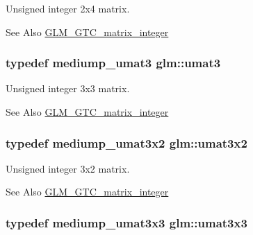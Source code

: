 Unsigned integer 2x4 matrix. 

\begin{DoxySeeAlso}{See Also}
\hyperlink{group__gtc__matrix__integer}{G\-L\-M\-\_\-\-G\-T\-C\-\_\-matrix\-\_\-integer} 
\end{DoxySeeAlso}
\hypertarget{group__gtc__matrix__integer_ga8b8fbc858e28abf8fc344744f8d6d368}{
\subsubsection[{umat3}]{\setlength{\rightskip}{0pt plus 5cm}typedef mediump\-\_\-umat3 {\bf glm\-::umat3}}}\label{group__gtc__matrix__integer_ga8b8fbc858e28abf8fc344744f8d6d368}


Unsigned integer 3x3 matrix. 

\begin{DoxySeeAlso}{See Also}
\hyperlink{group__gtc__matrix__integer}{G\-L\-M\-\_\-\-G\-T\-C\-\_\-matrix\-\_\-integer} 
\end{DoxySeeAlso}
\hypertarget{group__gtc__matrix__integer_ga257300f2710612877ef45438a366e308}{
\subsubsection[{umat3x2}]{\setlength{\rightskip}{0pt plus 5cm}typedef mediump\-\_\-umat3x2 {\bf glm\-::umat3x2}}}\label{group__gtc__matrix__integer_ga257300f2710612877ef45438a366e308}


Unsigned integer 3x2 matrix. 

\begin{DoxySeeAlso}{See Also}
\hyperlink{group__gtc__matrix__integer}{G\-L\-M\-\_\-\-G\-T\-C\-\_\-matrix\-\_\-integer} 
\end{DoxySeeAlso}
\hypertarget{group__gtc__matrix__integer_gab80b6501ba1b2c40119a0f2d256f4c97}{
\subsubsection[{umat3x3}]{\setlength{\rightskip}{0pt plus 5cm}typedef mediump\-\_\-umat3x3 {\bf glm\-::umat3x3}}}\label{group__gtc__matrix__integer_gab80b6501ba1b2c40119a0f2d256f4c97}


